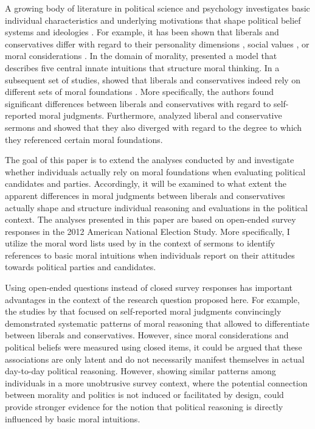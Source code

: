 \documentclass[12pt]{article}
\begin{document}
A growing body of literature in political science and psychology investigates basic individual characteristics and underlying motivations that shape political belief systems and ideologies \citep[c.f.][]{jost2003political,jost2006end,jost2009political}. For example, it has been shown that liberals and conservatives differ with regard to their personality dimensions \citep{gerber2010personality,hirsh2010compassionate,de2013personality}, social values \citep{schwartz2010basic,schwartz2011basic,piurko2011basic}, or moral considerations \citep{lakoff1995metaphor,haidt2008moral,mcadams2008family}. In the domain of morality, \citet{haidt2008moral} presented a model that describes five central innate intuitions that structure moral thinking. In a subsequent set of studies, \citet{graham2009liberals} showed that liberals and conservatives indeed rely on different sets of moral foundations \citep[see also][]{haidt2007morality}. More specifically, the authors found significant differences between liberals and conservatives with regard to self-reported moral judgments. Furthermore, \citet{graham2009liberals} analyzed liberal and conservative sermons and showed that they also diverged with regard to the degree to which they referenced certain moral foundations.

The goal of this paper is to extend the analyses conducted by \citet{graham2009liberals} and investigate whether individuals actually rely on moral foundations when evaluating political candidates and parties. Accordingly, it will be examined to what extent the apparent differences in moral judgments between liberals and conservatives actually shape and structure individual reasoning and evaluations in the political context. The analyses presented in this paper are based on open-ended survey responses in the 2012 American National Election Study. More specifically, I utilize the moral word lists used by \citet{graham2009liberals} in the context of sermons to identify references to basic moral intuitions when individuals report on their attitudes towards political parties and candidates.

Using open-ended questions instead of closed survey responses has important advantages in the context of the research question proposed here. For example, the studies by \citet{graham2009liberals} that focused on self-reported moral judgments convincingly demonstrated systematic patterns of moral reasoning that allowed to differentiate between liberals and conservatives. However, since moral considerations and political beliefs were measured using closed items, it could be argued that these associations are only latent and do not necessarily manifest themselves in actual day-to-day political reasoning. However, showing similar patterns among individuals in a more unobtrusive survey context, where the potential connection between morality and politics is not induced or facilitated by design, could provide stronger evidence for the notion that political reasoning is directly influenced by basic moral intuitions.
\end{document}
